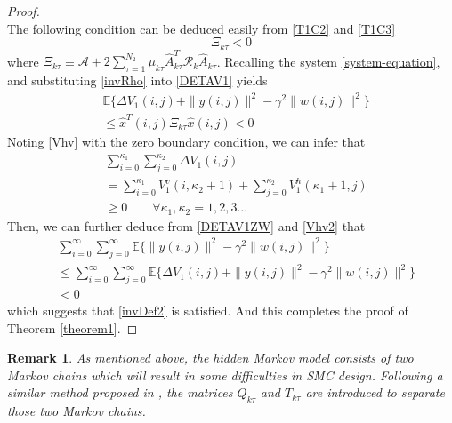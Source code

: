 \documentclass[journal,final,twocolumn]{IEEEtran}
\newtheorem{remark}{Remark}
\begin{document}
\begin{proof}
\begin{equation}
	\end{equation} 
	The following condition can be deduced easily from \eqref{T1C2} and \eqref{T1C3}
	\begin{equation}\label{T1P4}
	\mathcal{\varXi}_{k\tau }<0
	\end{equation}	
	where $\mathcal{\varXi}_{k\tau } \equiv \mathcal{A} +2\sum_{\tau =1}^{N_{2}}\mu_{k\tau }\hat{A}^{T}_{k\tau }\mathcal{R}_{k}\hat{A}_{k\tau }$. 
	Recalling the system \eqref{system-equation}, and substituting \eqref{invRho} into \eqref{DETAV1} yields
	\begin{equation}\label{DETAV1ZW}
		\begin{split}
			&\mathbb{E}\{\varDelta V_{1}(i,j)+\|y(i,j)\|^{2}-\gamma^{2}\|w(i,j)\|^{2}  \}\\
			&\leq \hat{x}^{T}(i,j)\mathcal{\varXi}_{k\tau } \hat{x}(i,j)<0
		\end{split}
	\end{equation}
	Noting \eqref{Vhv} with the zero boundary condition, we can infer that
	\begin{equation} \label{Vhv2}
	\begin{split}
	&\sum_{i=0}^{\kappa_{1}}\sum_{j=0}^{\kappa_{2}}  \varDelta V_{1}(i,j)\\
	&=\sum_{i=0}^{\kappa_{1}}V^{v}_{1}(i,\kappa_{2}+1) + \sum_{j=0}^{\kappa_{2}}V^{h}_{1}(\kappa_{1}+1,j) \\
	&\geq 0 \qquad \forall \kappa_{1},\kappa_{2} = 1,2,3...
	\end{split}
	\end{equation}
	Then, we can further deduce from \eqref{DETAV1ZW} and \eqref{Vhv2} that 
	\begin{equation}\label{DETAV1ZW2}
	\begin{split}
	&\sum_{i=0}^{\infty}\sum_{j=0}^{\infty}  \mathbb{E}\{\|y(i,j)\|^{2}-\gamma^{2}\|w(i,j)\|^{2}  \}\\
	&\leq \sum_{i=0}^{\infty}\sum_{j=0}^{\infty}  \mathbb{E}\{\varDelta V_{1}(i,j)+\|y(i,j)\|^{2}-\gamma^{2}\|w(i,j)\|^{2}  \}  \\
	&< 0
	\end{split}
	\end{equation}
	which suggests that \eqref{invDef2} is satisfied. And this completes the proof of Theorem \ref{theorem1}.
	
	
\end{proof}


\begin{remark}
	As mentioned above, the hidden Markov model consists of two Markov chains which will result in some difficulties in SMC design. Following a similar method proposed in \cite{wu2016passivity}, the matrices $Q_{k\tau }$ and $T_{k\tau}$ are introduced to separate those two Markov chains.
\end{remark}
\end{document}
